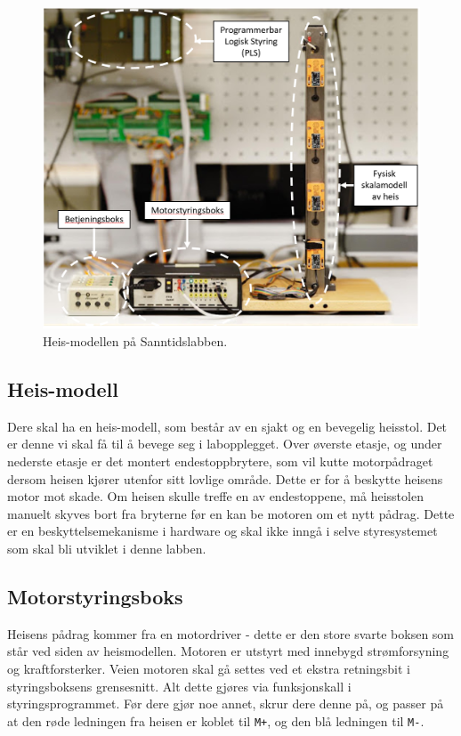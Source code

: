 \begin{alphasection}
\begin{figure}[ht!]
    \centering
    \includegraphics[scale=.85]{Main/figures/heis.PNG}
    \caption{Heis-modellen på Sanntidslabben.}
    \label{fig:Heis-modell}
\end{figure}

\subsection{Heis-modell}

Dere skal ha en heis-modell, som består av en sjakt og en bevegelig heisstol. Det er denne vi skal få til å bevege seg i labopplegget. Over øverste etasje, og under nederste etasje er det montert endestoppbrytere, som vil kutte motorpådraget dersom heisen kjører utenfor sitt lovlige område. Dette er for å beskytte heisens motor mot skade. Om heisen skulle treffe en av endestoppene, må heisstolen manuelt skyves bort fra bryterne før en kan be motoren om et nytt pådrag. Dette er en beskyttelsemekanisme i hardware og skal ikke inngå i selve styresystemet som skal bli utviklet i denne labben.



\subsection{Motorstyringsboks}
Heisens pådrag kommer fra en motordriver - dette er den store svarte boksen som står ved siden av heismodellen.  Motoren er utstyrt med innebygd strømforsyning og kraftforsterker. Veien motoren skal gå settes ved et ekstra retningsbit i styringsboksens grensesnitt. Alt dette gjøres via funksjonskall i styringsprogrammet. Før dere gjør noe annet, skrur dere denne på, og passer på at den røde ledningen fra heisen er koblet til \verb|M+|, og den blå ledningen til \verb|M-|.



\end{alphasection}
